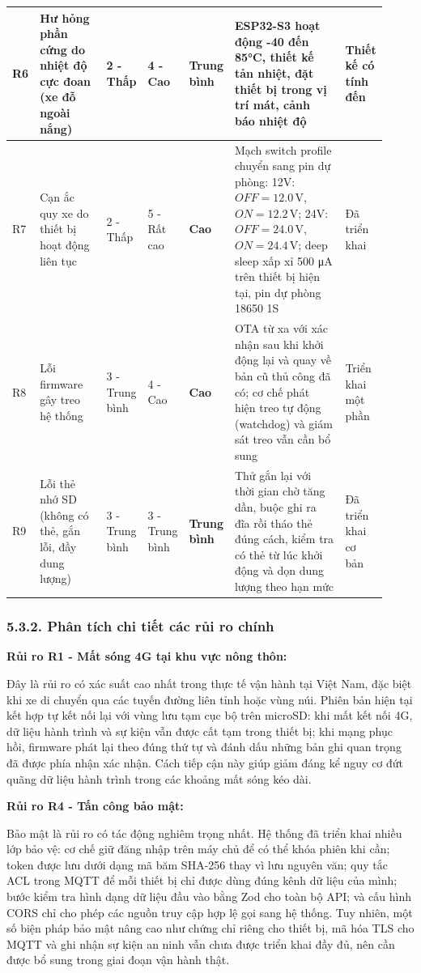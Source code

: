 \documentclass[a4paper]{extarticle}
\begin{document}
{\begin{longtable}{|L{0.055\linewidth}|L{0.180\linewidth}|L{0.090\linewidth}|L{0.090\linewidth}|L{0.120\linewidth}|L{0.300\linewidth}|L{0.090\linewidth}|}
R6 & Hư hỏng phần cứng do nhiệt độ cực đoan (xe đỗ ngoài nắng) & 2 -
Thấp & 4 - Cao & \textbf{Trung bình} & ESP32-S3 hoạt động -40 đến 85°C,
thiết kế tản nhiệt, đặt thiết bị trong vị trí mát, cảnh báo nhiệt độ &
Thiết kế có tính đến \\\hline
R7 & Cạn ắc quy xe do thiết bị hoạt động liên tục & 2 - Thấp & 5 - Rất
cao & \textbf{Cao} & Mạch switch profile chuyển sang pin dự phòng: 12V:
\(OFF = 12.0\,\mathrm{V}\), \(ON = 12.2\,\mathrm{V}\); 24V:
\(OFF = 24.0\,\mathrm{V}\), \(ON = 24.4\,\mathrm{V}\); deep sleep xấp xỉ 500
μA trên thiết bị hiện tại, pin dự phòng 18650 1S & Đã triển khai \\\hline
R8 & Lỗi firmware gây treo hệ thống & 3 - Trung bình & 4
- Cao & \textbf{Cao} & OTA từ xa với xác nhận sau khi khởi động lại và
quay về bản cũ thủ công đã có; cơ chế phát hiện treo tự động
(watchdog) và giám sát treo vẫn cần bổ sung &
Triển khai một phần \\\hline
R9 & Lỗi thẻ nhớ SD (không có thẻ, gắn lỗi, đầy dung lượng) & 3 - Trung bình &
3 - Trung bình & \textbf{Trung bình} & Thử gắn lại với thời gian chờ tăng dần, buộc ghi ra đĩa rồi tháo thẻ đúng cách, kiểm tra có thẻ từ lúc khởi động và dọn dung lượng theo hạn mức
& Đã triển khai cơ bản \\\hline
\end{longtable}
}


\subsubsection{5.3.2. Phân tích chi tiết các rủi ro
chính}\label{532-phuxe2n-tuxedch-chi-tiux1ebft-cuxe1c-rux1ee7i-ro-chuxednh}

\textbf{Rủi ro R1 - Mất sóng 4G tại khu vực nông thôn:}

Đây là rủi ro có xác suất cao nhất trong thực tế vận hành tại Việt Nam,
đặc biệt khi xe di chuyển qua các tuyến đường liên tỉnh hoặc vùng núi.
Phiên bản hiện tại kết hợp tự kết nối lại với vùng lưu tạm cục bộ trên
microSD: khi mất kết nối 4G, dữ liệu hành trình và sự kiện vẫn được cất
tạm trong thiết bị; khi mạng phục hồi, firmware phát lại theo đúng thứ
tự và đánh dấu những bản ghi quan trọng đã được phía nhận xác nhận. Cách
tiếp cận này giúp giảm đáng kể nguy cơ đứt quãng dữ liệu hành trình
trong các khoảng mất sóng kéo dài.

\textbf{Rủi ro R4 - Tấn công bảo mật:}

Bảo mật là rủi ro có tác động nghiêm trọng nhất. Hệ thống đã triển khai
nhiều lớp bảo vệ: cơ chế giữ đăng nhập trên máy chủ để có thể khóa phiên
khi cần; token được lưu dưới dạng mã băm SHA-256 thay vì lưu nguyên văn;
quy tắc ACL trong MQTT để mỗi thiết bị chỉ được dùng đúng kênh dữ liệu
của mình; bước kiểm tra hình dạng dữ liệu đầu vào bằng Zod cho toàn bộ
API; và cấu hình CORS chỉ cho phép các nguồn truy cập hợp lệ gọi sang hệ
thống. Tuy nhiên, một số biện pháp bảo mật nâng cao như chứng chỉ riêng
cho thiết bị, mã hóa TLS cho MQTT và ghi nhận sự kiện an ninh vẫn chưa
được triển khai đầy đủ, nên cần được bổ sung trong giai đoạn vận hành thật.
\end{document}
